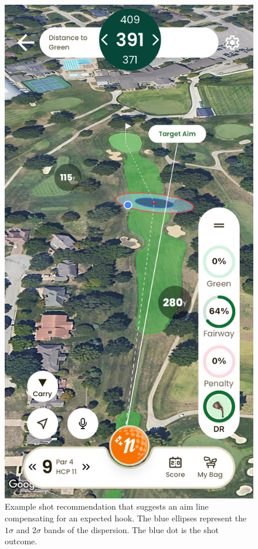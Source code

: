 \documentclass[11pt,a4paper]{article}
\begin{document}
\begin{figure}[h!]
    \centering
    \includegraphics[scale=0.12]{IMG_7794.PNG}
    \caption{Example shot recommendation that suggests an aim line compensating for an expected hook. The blue ellipses represent the $1\sigma$ and $2\sigma$ bands of the dispersion. The blue dot is the shot outcome. }
\label{fig:rec}
\end{figure}
\FloatBarrier
\end{document}
